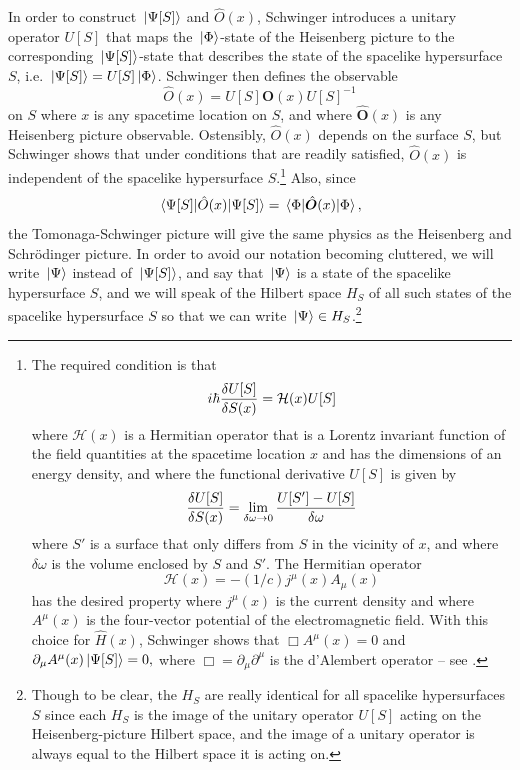 In order to construct $\ket*{\Psi[S]}$ and $\hat{O}(x)$, Schwinger introduces a unitary operator $U[S]$ that maps the $\ket*{\Phi}$-state of the Heisenberg picture to the corresponding $\ket*{\Psi[S]}$-state that describes the state of the spacelike hypersurface $S$, i.e. $\ket*{\Psi[S]}=U[S]\ket*{\Phi}$. Schwinger then defines the observable  
\begin{equation}\label{tsobservable}
  \hat{O}(x)=U[S]\hat{\bm{O}}(x)U[S]^{-1}
\end{equation}
on $S$ where $x$ is any spacetime location on $S$, and where $\hat{\bm{O}}(x)$ is any Heisenberg picture observable. Ostensibly, $\hat{O}(x)$ depends on the surface $S$,  but Schwinger shows that under conditions that are readily satisfied, $\hat{O}(x)$ is independent of the spacelike hypersurface $S$.\footnote{
  The required condition is that 
  $$i\hbar\fdv{U[S]}{S(x)}=\mathcal{H}(x)U[S] $$
  where $\mathcal{H}(x)$ is a Hermitian operator that is a Lorentz invariant function of the field quantities at the spacetime location $x$ and has the dimensions of an energy density, and where the functional derivative $U[S]$ is given by
  $$\fdv{U[S]}{S(x)}=\lim_{\delta \omega\rightarrow 0}\frac{U[S']-U[S]}{\delta\omega} $$
  where $S'$ is a surface that only differs from $S$ in the vicinity of $x$, and where $\delta\omega$ is the volume enclosed by $S$ and $S'$. The Hermitian operator $$\mathcal{H}(x)=-(1/c)j^\mu(x)A_\mu(x)$$
  has the desired property where $j^\mu(x)$ is the current density and where $A^\mu(x)$ is the four-vector potential of the electromagnetic field. With this choice for $\hat{H}(x)$, Schwinger shows that $\Box A^\mu(x)=0$ and $\partial_\mu A^\mu(x)\ket*{\Psi[S]}=0,$ where $\Box=\partial_\mu\partial^\mu$ is the d'Alembert operator -- see \cite[p. 1449-1450]{SchwingerJulianI}.  }
  Also, since 
$$\ev*{\hat{O}(x)}{\Psi[S]}=\ev*{\hat{\bm{O}}(x)}{\Phi},$$
the Tomonaga-Schwinger picture will give the same physics as the Heisenberg and Schr\"{o}dinger picture. In order to avoid our notation becoming cluttered, we will write $\ket*{\Psi}$ instead of $\ket*{\Psi[S]}$, and say that $\ket*{\Psi}$ is a state of the spacelike hypersurface $S$, and we will speak of the Hilbert space $H_S$ of all such states of the spacelike hypersurface $S$ so that we can write $\ket*{\Psi}\in H_S$.\footnote{Though to be clear, the $H_S$ are really identical for all spacelike hypersurfaces $S$ since each $H_S$ is the image of the unitary operator $U[S]$ acting on the Heisenberg-picture Hilbert space, and the image of a unitary operator is always equal to the Hilbert space it is acting on.}

